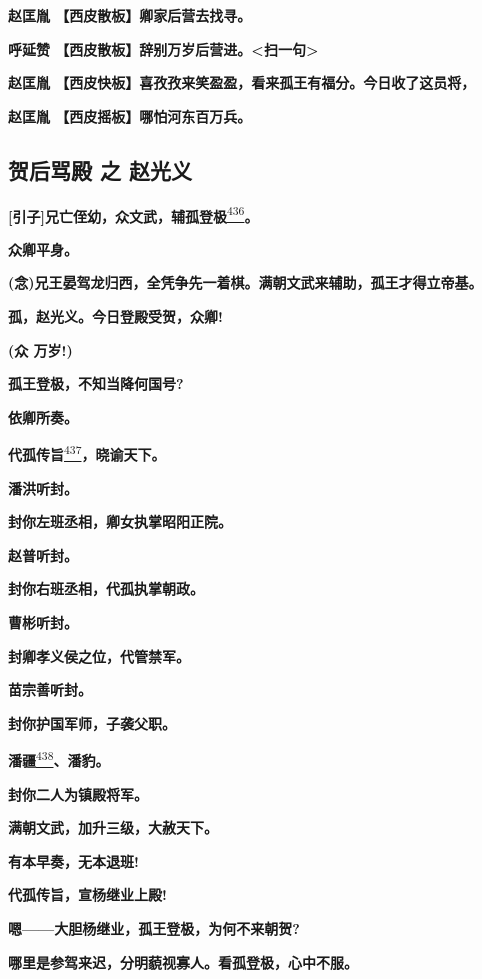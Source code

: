 \textbf{赵匡胤 【西皮散板】卿家后营去找寻。}

\textbf{呼延赞
【西皮散板】辞别万岁后营进。\textless{}扫一句\textgreater{}}

\textbf{赵匡胤
【西皮快板】喜孜孜来笑盈盈，看来孤王有福分。今日收了这员将，}

\textbf{赵匡胤 【西皮摇板】哪怕河东百万兵。}

\hypertarget{ux8d3aux540eux9a82ux6bbf-ux4e4b-ux8d75ux5149ux4e49}{%
\subsection{贺后骂殿 之
赵光义}\label{ux8d3aux540eux9a82ux6bbf-ux4e4b-ux8d75ux5149ux4e49}}

\textbf{{[}引子{]}兄亡侄幼，众文武，辅孤登极}\protect\hyperlink{fn436}{\textsuperscript{436}}\textbf{。}

\textbf{众卿平身。}

\textbf{(念)兄王晏驾龙归西，全凭争先一着棋。满朝文武来辅助，孤王才得立帝基。}

\textbf{孤，赵光义。今日登殿受贺，众卿!}

\textbf{(众 万岁!)}

\textbf{孤王登极，不知当降何国号?}

\textbf{依卿所奏。}

\textbf{代孤传旨}\protect\hyperlink{fn437}{\textsuperscript{437}}\textbf{，晓谕天下。}

\textbf{潘洪听封。}

\textbf{封你左班丞相，卿女执掌昭阳正院。}

\textbf{赵普听封。}

\textbf{封你右班丞相，代孤执掌朝政。}

\textbf{曹彬听封。}

\textbf{封卿孝义侯之位，代管禁军。}

\textbf{苗宗善听封。}

\textbf{封你护国军师，子袭父职。}

\textbf{潘疆}\protect\hyperlink{fn438}{\textsuperscript{438}}\textbf{、潘豹。}

\textbf{封你二人为镇殿将军。}

\textbf{满朝文武，加升三级，大赦天下。}

\textbf{有本早奏，无本退班!}

\textbf{代孤传旨，宣杨继业上殿!}

\textbf{嗯------大胆杨继业，孤王登极，为何不来朝贺?}

\textbf{哪里是参驾来迟，分明藐视寡人。看孤登极，心中不服。}

